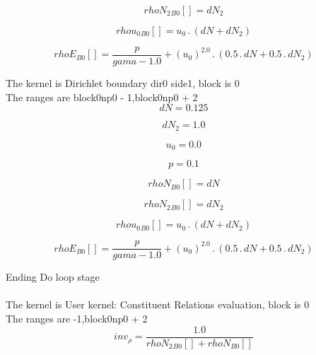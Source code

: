 \documentclass{article}
\begin{document}
\begin{dmath}{rhoN_{2}{_{B0}}}[{}] = dN_{2}\end{dmath}

\begin{dmath}{rhou_{0}{_{B0}}}[{}] = u_{0} \,.\, \left(dN + dN_{2}\right)\end{dmath}

\begin{dmath}{rhoE{_{B0}}}[{}] = \frac{p}{gama - 1.0} + \left(u_{0} \right)^{2.0} \,.\, \left(0.5 \,.\, dN + 0.5 \,.\, dN_{2}\right)\end{dmath}

\noindent The kernel is Dirichlet boundary dir0 side1, block is 0\\\noindent The ranges are block0np0 - 1,block0np0 + 2\\\begin{dmath}dN = 0.125\end{dmath}

\begin{dmath}dN_{2} = 1.0\end{dmath}

\begin{dmath}u_{0} = 0.0\end{dmath}

\begin{dmath}p = 0.1\end{dmath}

\begin{dmath}{rhoN{_{B0}}}[{}] = dN\end{dmath}

\begin{dmath}{rhoN_{2}{_{B0}}}[{}] = dN_{2}\end{dmath}

\begin{dmath}{rhou_{0}{_{B0}}}[{}] = u_{0} \,.\, \left(dN + dN_{2}\right)\end{dmath}

\begin{dmath}{rhoE{_{B0}}}[{}] = \frac{p}{gama - 1.0} + \left(u_{0} \right)^{2.0} \,.\, \left(0.5 \,.\, dN + 0.5 \,.\, dN_{2}\right)\end{dmath}

\noindent Ending Do loop stage\\
\\\noindent The kernel is User kernel: Constituent Relations evaluation, block is 0\\\noindent The ranges are -1,block0np0 + 2\\\begin{dmath}inv_{\rho} = \frac{1.0}{{rhoN_{2}{_{B0}}}[{}] + {rhoN{_{B0}}}[{}]}\end{dmath}
\end{document}
